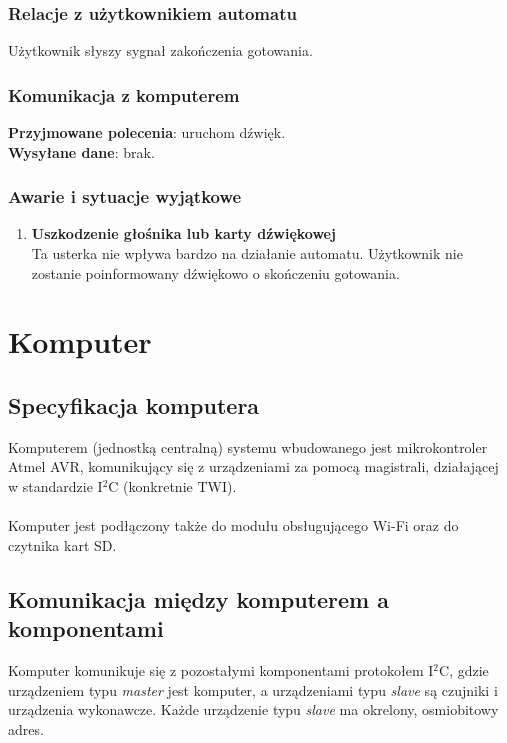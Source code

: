 \documentclass[12pt,a4paper,notitlepage]{article}
\begin{document}
\subsubsection{Relacje z użytkownikiem automatu}
Użytkownik słyszy sygnał zakończenia gotowania.

\subsubsection{Komunikacja z komputerem}
\textbf{Przyjmowane polecenia}: uruchom dźwięk.\\
\textbf{Wysyłane dane}: brak.

\subsubsection{Awarie i sytuacje wyjątkowe}
\begin{enumerate}
  \item \textbf{Uszkodzenie głośnika lub karty dźwiękowej}\\
Ta usterka nie wpływa bardzo na działanie automatu. Użytkownik nie zostanie poinformowany dźwiękowo o skończeniu gotowania.
\end{enumerate}

\section{Komputer}

\subsection{Specyfikacja komputera}

Komputerem (jednostką centralną) systemu wbudowanego jest mikrokontroler Atmel AVR, komunikujący się z urządzeniami za pomocą magistrali, działającej w standardzie I$^2$C (konkretnie TWI). \\ \\
Komputer jest podłączony także do modułu obsługującego Wi-Fi oraz do czytnika kart SD. 

\subsection{Komunikacja między komputerem a komponentami}
Komputer komunikuje się z pozostałymi komponentami protokołem I$^2$C, gdzie urządzeniem typu \emph{master} jest komputer, a urządzeniami typu \emph{slave} są czujniki i urządzenia wykonawcze. Każde urządzenie typu \emph{slave} ma okrelony, osmiobitowy adres. 
\end{document}
